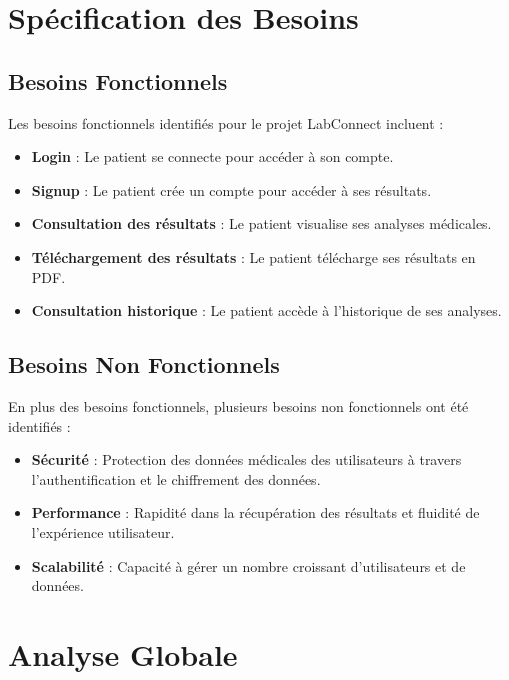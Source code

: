 \documentclass[12pt,a4paper]{report}
\begin{document}
\section{Spécification des Besoins}

\subsection{Besoins Fonctionnels}
Les besoins fonctionnels identifiés pour le projet LabConnect incluent :

\begin{itemize}
    \item \textbf{Login} : Le patient se connecte pour accéder à son compte.
    \item \textbf{Signup} : Le patient crée un compte pour accéder à ses résultats.
    \item \textbf{Consultation des résultats} : Le patient visualise ses analyses médicales.
    \item \textbf{Téléchargement des résultats} : Le patient télécharge ses résultats en PDF.
    \item \textbf{Consultation historique} : Le patient accède à l'historique de ses analyses.
\end{itemize}

\subsection{Besoins Non Fonctionnels}
En plus des besoins fonctionnels, plusieurs besoins non fonctionnels ont été identifiés :

\begin{itemize}
    \item \textbf{Sécurité} : Protection des données médicales des utilisateurs à travers l'authentification et le chiffrement des données.
    \item \textbf{Performance} : Rapidité dans la récupération des résultats et fluidité de l'expérience utilisateur.
    \item \textbf{Scalabilité} : Capacité à gérer un nombre croissant d'utilisateurs et de données.
\end{itemize}

\section{Analyse Globale}
\end{document}

